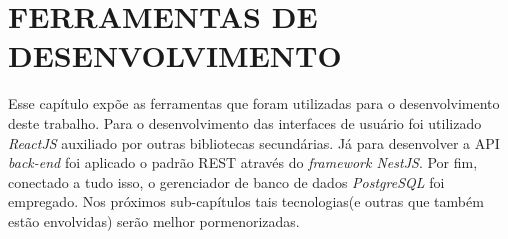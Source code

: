 \chapter{FERRAMENTAS DE DESENVOLVIMENTO}
\label{chap:ferramentasDeDesenvolvimento}

Esse capítulo expõe as ferramentas que foram utilizadas para o desenvolvimento deste trabalho. Para o desenvolvimento das interfaces de usuário foi utilizado \textit{ReactJS} auxiliado por outras bibliotecas secundárias. Já para desenvolver a API \textit{back-end} foi aplicado o padrão REST através do \textit{framework NestJS}. Por fim, conectado a tudo isso, o gerenciador de banco de dados \textit{PostgreSQL} foi empregado. Nos próximos sub-capítulos tais tecnologias(e outras que também estão envolvidas) serão melhor pormenorizadas.






